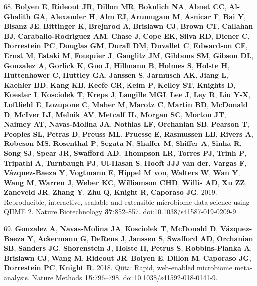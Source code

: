 \documentclass[11pt,]{article}
\begin{document}
\leavevmode\hypertarget{ref-Bolyen2019}{}%
68. \textbf{Bolyen E}, \textbf{Rideout JR}, \textbf{Dillon MR},
\textbf{Bokulich NA}, \textbf{Abnet CC}, \textbf{Al-Ghalith GA},
\textbf{Alexander H}, \textbf{Alm EJ}, \textbf{Arumugam M},
\textbf{Asnicar F}, \textbf{Bai Y}, \textbf{Bisanz JE},
\textbf{Bittinger K}, \textbf{Brejnrod A}, \textbf{Brislawn CJ},
\textbf{Brown CT}, \textbf{Callahan BJ}, \textbf{Caraballo-Rodrı́guez
AM}, \textbf{Chase J}, \textbf{Cope EK}, \textbf{Silva RD},
\textbf{Diener C}, \textbf{Dorrestein PC}, \textbf{Douglas GM},
\textbf{Durall DM}, \textbf{Duvallet C}, \textbf{Edwardson CF},
\textbf{Ernst M}, \textbf{Estaki M}, \textbf{Fouquier J},
\textbf{Gauglitz JM}, \textbf{Gibbons SM}, \textbf{Gibson DL},
\textbf{Gonzalez A}, \textbf{Gorlick K}, \textbf{Guo J},
\textbf{Hillmann B}, \textbf{Holmes S}, \textbf{Holste H},
\textbf{Huttenhower C}, \textbf{Huttley GA}, \textbf{Janssen S},
\textbf{Jarmusch AK}, \textbf{Jiang L}, \textbf{Kaehler BD},
\textbf{Kang KB}, \textbf{Keefe CR}, \textbf{Keim P}, \textbf{Kelley
ST}, \textbf{Knights D}, \textbf{Koester I}, \textbf{Kosciolek T},
\textbf{Kreps J}, \textbf{Langille MGI}, \textbf{Lee J}, \textbf{Ley R},
\textbf{Liu Y-X}, \textbf{Loftfield E}, \textbf{Lozupone C},
\textbf{Maher M}, \textbf{Marotz C}, \textbf{Martin BD},
\textbf{McDonald D}, \textbf{McIver LJ}, \textbf{Melnik AV},
\textbf{Metcalf JL}, \textbf{Morgan SC}, \textbf{Morton JT},
\textbf{Naimey AT}, \textbf{Navas-Molina JA}, \textbf{Nothias LF},
\textbf{Orchanian SB}, \textbf{Pearson T}, \textbf{Peoples SL},
\textbf{Petras D}, \textbf{Preuss ML}, \textbf{Pruesse E},
\textbf{Rasmussen LB}, \textbf{Rivers A}, \textbf{Robeson MS},
\textbf{Rosenthal P}, \textbf{Segata N}, \textbf{Shaffer M},
\textbf{Shiffer A}, \textbf{Sinha R}, \textbf{Song SJ}, \textbf{Spear
JR}, \textbf{Swafford AD}, \textbf{Thompson LR}, \textbf{Torres PJ},
\textbf{Trinh P}, \textbf{Tripathi A}, \textbf{Turnbaugh PJ},
\textbf{Ul-Hasan S}, \textbf{Hooft JJJ van der}, \textbf{Vargas F},
\textbf{Vázquez-Baeza Y}, \textbf{Vogtmann E}, \textbf{Hippel M von},
\textbf{Walters W}, \textbf{Wan Y}, \textbf{Wang M}, \textbf{Warren J},
\textbf{Weber KC}, \textbf{Williamson CHD}, \textbf{Willis AD},
\textbf{Xu ZZ}, \textbf{Zaneveld JR}, \textbf{Zhang Y}, \textbf{Zhu Q},
\textbf{Knight R}, \textbf{Caporaso JG}. 2019. Reproducible,
interactive, scalable and extensible microbiome data science using QIIME
2. Nature Biotechnology \textbf{37}:852--857.
doi:\href{https://doi.org/10.1038/s41587-019-0209-9}{10.1038/s41587-019-0209-9}.

\leavevmode\hypertarget{ref-Gonzalez2018}{}%
69. \textbf{Gonzalez A}, \textbf{Navas-Molina JA}, \textbf{Kosciolek T},
\textbf{McDonald D}, \textbf{Vázquez-Baeza Y}, \textbf{Ackermann G},
\textbf{DeReus J}, \textbf{Janssen S}, \textbf{Swafford AD},
\textbf{Orchanian SB}, \textbf{Sanders JG}, \textbf{Shorenstein J},
\textbf{Holste H}, \textbf{Petrus S}, \textbf{Robbins-Pianka A},
\textbf{Brislawn CJ}, \textbf{Wang M}, \textbf{Rideout JR},
\textbf{Bolyen E}, \textbf{Dillon M}, \textbf{Caporaso JG},
\textbf{Dorrestein PC}, \textbf{Knight R}. 2018. Qiita: Rapid,
web-enabled microbiome meta-analysis. Nature Methods
\textbf{15}:796--798.
doi:\href{https://doi.org/10.1038/s41592-018-0141-9}{10.1038/s41592-018-0141-9}.
\end{document}
